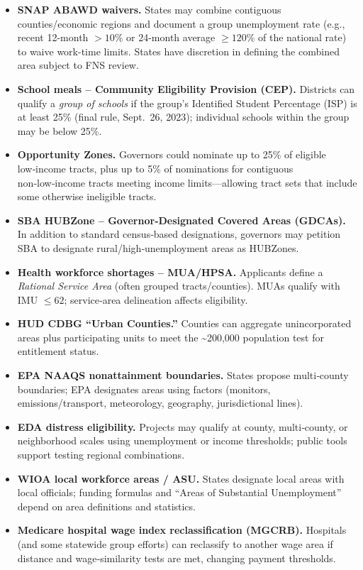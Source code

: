 \documentclass[11.5pt]{article}
\begin{document}
\begin{itemize}
  \item \textbf{SNAP ABAWD waivers.} States may combine contiguous counties/economic regions and document a group unemployment rate (e.g., recent 12-month $>10\%$ or 24-month average $\ge 120\%$ of the national rate) to waive work-time limits. States have discretion in defining the combined area subject to FNS review. 

  \item \textbf{School meals – Community Eligibility Provision (CEP).} Districts can qualify a \emph{group of schools} if the group’s Identified Student Percentage (ISP) is at least 25\% (final rule, Sept.\ 26, 2023); individual schools within the group may be below 25\%.

  \item \textbf{Opportunity Zones.} Governors could nominate up to 25\% of eligible low‑income tracts, plus up to 5\% of nominations for contiguous non‑low‑income tracts meeting income limits—allowing tract sets that include some otherwise ineligible tracts. 

  \item \textbf{SBA HUBZone – Governor‑Designated Covered Areas (GDCAs).} In addition to standard census‑based designations, governors may petition SBA to designate rural/high‑unemployment areas as HUBZones. 

  \item \textbf{Health workforce shortages – MUA/HPSA.} Applicants define a \emph{Rational Service Area} (often grouped tracts/counties). MUAs qualify with IMU $\le 62$; service‑area delineation affects eligibility. 

  \item \textbf{HUD CDBG “Urban Counties.”} Counties can aggregate unincorporated areas plus participating units to meet the \textasciitilde200{,}000 population test for entitlement status.

  \item \textbf{EPA NAAQS nonattainment boundaries.} States propose multi‑county boundaries; EPA designates areas using factors (monitors, emissions/transport, meteorology, geography, jurisdictional lines). 

  \item \textbf{EDA distress eligibility.} Projects may qualify at county, multi‑county, or neighborhood scales using unemployment or income thresholds; public tools support testing regional combinations. 

  \item \textbf{WIOA local workforce areas / ASU.} States designate local areas with local officials; funding formulas and “Areas of Substantial Unemployment” depend on area definitions and statistics. 

  \item \textbf{Medicare hospital wage index reclassification (MGCRB).} Hospitals (and some statewide group efforts) can reclassify to another wage area if distance and wage‑similarity tests are met, changing payment thresholds. 
\end{itemize}
\end{document}
